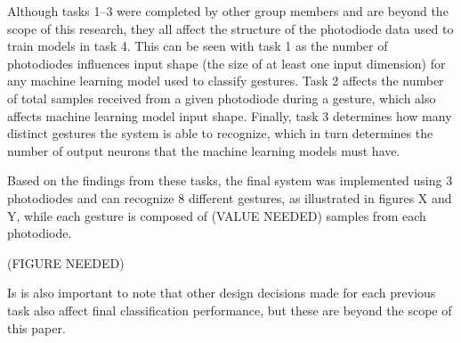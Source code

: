 Although tasks 1--3 were completed by other group members and are beyond the scope of this research, they all affect the structure of the photodiode data used to train models in task 4.
This can be seen with task 1 as the number of photodiodes influences input shape (the size of at least one input dimension) for any machine learning model used to classify gestures.
Task 2 affects the number of total samples received from a given photodiode during a gesture, which also affects machine learning model input shape.
Finally, task 3 determines how many distinct gestures the system is able to recognize, which in turn determines the number of output neurons that the machine learning models must have.

Based on the findings from these tasks, the final system was implemented using 3 photodiodes and can recognize 8 different gestures, as illustrated in figures X and Y\@, while each gesture is composed of (VALUE NEEDED) samples from each photodiode.

(FIGURE NEEDED)

Is is also important to note that other design decisions made for each previous task also affect final classification performance, but these are beyond the scope of this paper.
